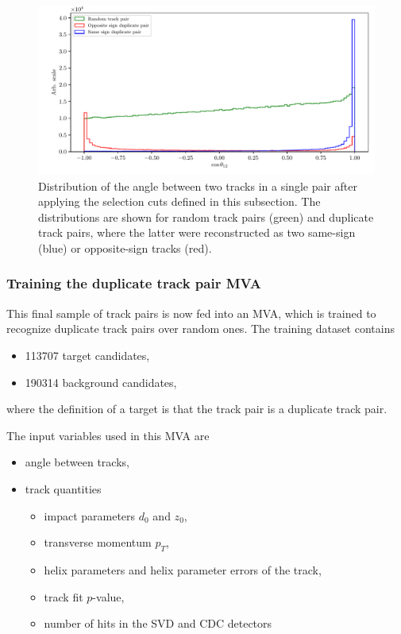 \begin{figure}[!htb]
	\centering
	\captionsetup{width=0.8\linewidth}
	\includegraphics[width=\linewidth]{fig/ROECleanup_dup_angle_final}
	\caption{Distribution of the angle between two tracks in a single pair after applying the selection cuts defined in this subsection. The distributions are shown for random track pairs (green) and duplicate track pairs, where the latter were reconstructed as two same-sign (blue) or opposite-sign tracks (red).}
	\label{fig:ROE_dupAngleFinal}
\end{figure}

\subsubsection{Training the duplicate track pair MVA}
\label{ss:trackMVA}

This final sample of track pairs is now fed into an MVA, which is trained to recognize duplicate track pairs over random ones. The training dataset contains
\begin{itemize}
	\item 113707 target candidates,
	\item 190314 background candidates,
\end{itemize}
where the definition of a target is that the track pair is a duplicate track pair. 

The input variables used in this MVA are
\begin{itemize}
	\item angle between tracks,
	\item track quantities
	\begin{itemize}
		\item impact parameters $d_0$ and $z_0$,
		\item transverse momentum $p_T$,
		\item helix parameters and helix parameter errors of the track,
		\item track fit $p$-value,
		\item number of hits in the SVD and CDC detectors
	\end{itemize}
\end{itemize}

